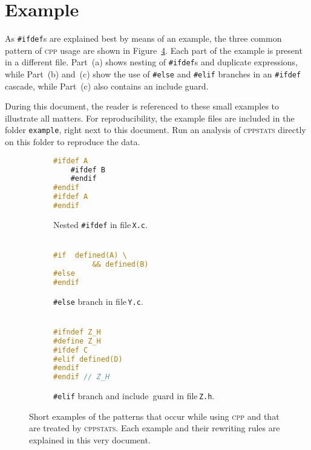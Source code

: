 \documentclass[a4paper]{scrartcl}
\newcommand\code[1]{\texttt{#1}}
\newcommand\tool[1]{\textsc{#1}}
\newcommand\ifdeff[1]{\code{\##1}\xspace}
\newcommand\ifdef[0]{{\upshape\ifdeff{ifdef}}\xspace}
\newcommand\ifdefs[0]{\ifdef{}s\xspace}
\newcommand\cppstats[0]{\tool{cppstats}\xspace}
\newcommand\cpp{\tool{cpp}\xspace}
\begin{document}
\section{Example}

As \ifdefs are explained best by means of an example, the three common pattern of \cpp usage are shown in Figure~\ref{fig:examples}.
Each part of the example is present in a different file.
Part~(a) shows nesting of \ifdefs and duplicate expressions, while Part~(b) and~(c) show the use of \ifdeff{else} and \ifdeff{elif} branches in an \ifdef cascade, while Part~(c) also contains an include guard.

During this document, the reader is referenced to these small examples to illustrate all matters.
For reproducibility, the example files are included in the folder \code{example}, right next to this document.
Run an analysis of \cppstats directly on this folder to reproduce the data.

\begin{figure}[ht]
        \centering
        \begin{subfigure}[b]{0.3\textwidth}
					\begin{lstlisting}[language=C]
#ifdef A
	#ifdef B
	#endif
#endif
#ifdef A
#endif
					\end{lstlisting}
					\caption{Nested \ifdef in file\,\code{X.c}.\\\,}
					\label{fig:examples:a}
        \end{subfigure}
        \hfill
        \begin{subfigure}[b]{0.3\textwidth}
					\begin{lstlisting}[language=C, firstnumber=5]
#if  defined(A) \
		 && defined(B)
#else 
#endif
					\end{lstlisting}
					\caption{\ifdeff{else} branch in file\,\code{Y.c}.\\\,}
					\label{fig:examples:b}
        \end{subfigure}
				\hfill
        \begin{subfigure}[b]{0.3\textwidth}
					\begin{lstlisting}[language=C, firstnumber=8]
#ifndef Z_H
#define Z_H
#ifdef C
#elif defined(D)
#endif
#endif // Z_H
					\end{lstlisting}
					\caption{\ifdeff{elif} branch and include~guard in file\,\code{Z.h}.}
					\label{fig:examples:c}
        \end{subfigure}     
        
        \caption{Short examples of the patterns that occur while using \cpp and that are treated by \cppstats. 
        	Each example and their rewriting rules are explained in this very document.}
        \label{fig:examples}
\end{figure}
\end{document}
